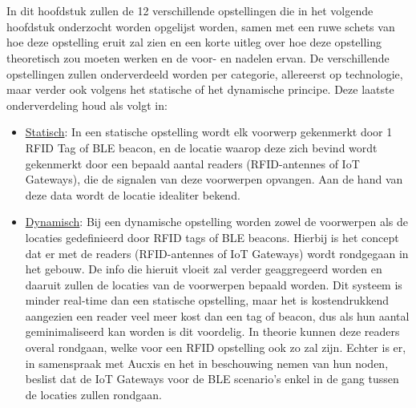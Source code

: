 \chapter{}
\label{ch:opstellingen}

In dit hoofdstuk zullen de 12 verschillende opstellingen die in het volgende hoofdstuk onderzocht worden opgelijst worden, samen met een ruwe schets van hoe deze opstelling eruit zal zien en een korte uitleg over hoe deze opstelling theoretisch zou moeten werken en de voor- en nadelen ervan.
De verschillende opstellingen zullen onderverdeeld worden per categorie, allereerst op technologie, maar verder ook volgens het statische of het dynamische principe. 
Deze laatste onderverdeling houd als volgt in:
\begin{itemize}
	\item \underline{Statisch}:
	In een statische opstelling wordt elk voorwerp gekenmerkt door 1 RFID Tag of BLE beacon, en de locatie waarop deze zich bevind wordt gekenmerkt door een bepaald aantal readers (RFID-antennes of IoT Gateways), die de signalen van deze voorwerpen opvangen. Aan de hand van deze data wordt de locatie idealiter bekend.
	\item \underline{Dynamisch}:
	Bij een dynamische opstelling worden zowel de voorwerpen als de locaties gedefinieerd door RFID tags of BLE beacons. Hierbij is het concept dat er met de readers (RFID-antennes of IoT Gateways) wordt rondgegaan in het gebouw. De info die hieruit vloeit zal verder geaggregeerd worden en daaruit zullen de locaties van de voorwerpen bepaald worden. Dit systeem is minder real-time dan een statische opstelling, maar het is kostendrukkend aangezien een reader veel meer kost dan een tag of beacon, dus als hun aantal geminimaliseerd kan worden is dit voordelig.
	In theorie kunnen deze readers overal rondgaan, welke voor een RFID opstelling ook zo zal zijn. Echter is er, in samenspraak met Aucxis en het in beschouwing nemen van hun noden, beslist dat de IoT Gateways voor de BLE scenario's enkel in de gang tussen de locaties zullen rondgaan.
\end{itemize}

